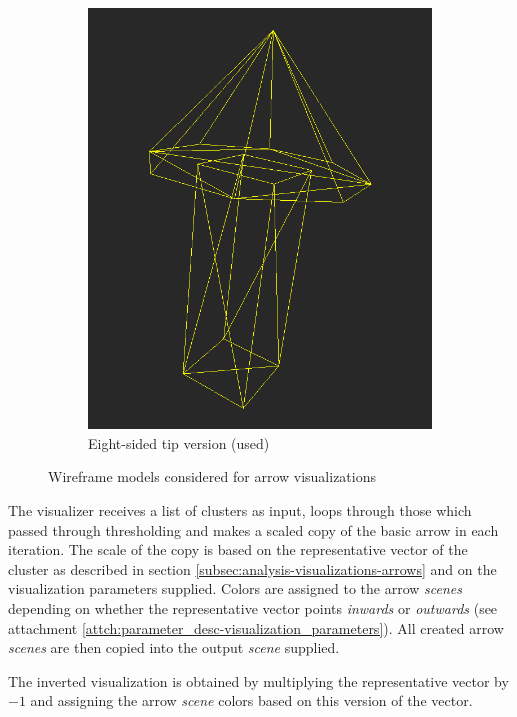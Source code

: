 \begin{figure}[h]
\begin{subfigure}{0.3\textwidth}
	\includegraphics[width=\textwidth]{./img/8sided_arrow.PNG}
    \caption{Eight-sided tip version (used)}
    \label{fig:meshdiff-8sided_arrow}
	\end{subfigure}
\caption[Wireframe models considered for arrow visualizations]{Wireframe models considered for arrow visualizations}
\end{figure}

The visualizer receives a list of clusters as input, loops through those which passed through thresholding and makes a scaled copy of the basic arrow in each iteration. The scale of the copy is based on the representative vector of the cluster as described in section \ref{subsec:analysis-visualizations-arrows} and on the visualization parameters supplied. Colors are assigned to the arrow {\it scenes} depending on whether the representative vector points {\it inwards} or {\it outwards} (see attachment \ref{attch:parameter_desc-visualization_parameters}). All created arrow {\it scenes} are then copied into the output {\it scene} supplied.

The inverted visualization is obtained by multiplying the representative vector by \(-1\) and assigning the arrow {\it scene} colors based on this version of the vector.

